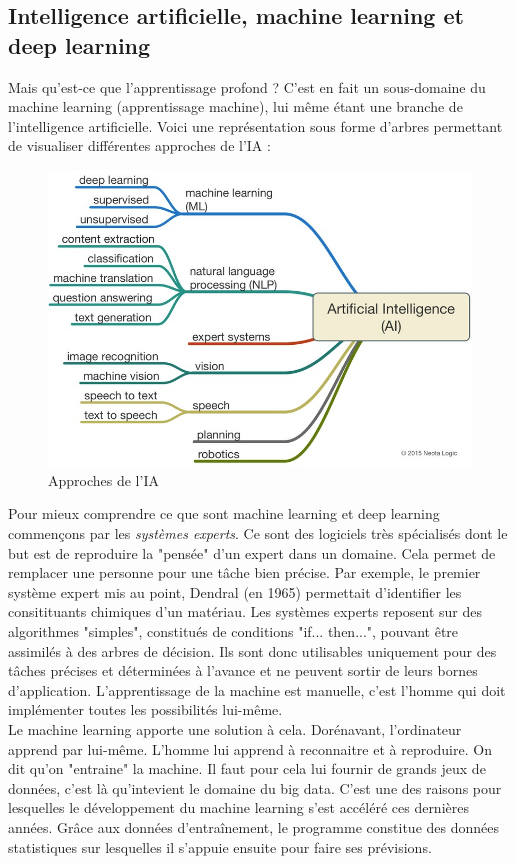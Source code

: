 \subsection{Intelligence artificielle, machine learning et deep learning}
	Mais qu'est-ce que l'apprentissage profond ? C'est en fait un sous-domaine du machine learning (apprentissage machine), lui même étant une branche de l'intelligence artificielle. Voici une représentation sous forme d'arbres permettant de visualiser différentes approches de l'IA : 
	\begin{figure}[H]
		\centering\includegraphics[width=0.7\linewidth]{images/branches}
		\caption{Approches de l'IA}
	\end{figure}
	Pour mieux comprendre ce que sont machine learning et deep learning commençons par les \textit{systèmes experts}. Ce sont des logiciels très spécialisés dont le but est de reproduire la "pensée" d'un expert dans un domaine. Cela permet de remplacer une personne pour une tâche bien précise. Par exemple, le premier système expert mis au point, Dendral (en 1965) permettait d'identifier les consitituants chimiques d'un matériau. Les systèmes experts reposent sur des algorithmes "simples", constitués de conditions "if... then...", pouvant être assimilés à des arbres de décision. Ils sont donc utilisables uniquement pour des tâches précises et déterminées à l'avance et ne peuvent sortir de leurs bornes d'application. L'apprentissage de la machine est manuelle, c'est l'homme qui doit implémenter toutes les possibilités lui-même.\\
	
	Le machine learning apporte une solution à cela. Dorénavant, l'ordinateur apprend par lui-même. L'homme lui apprend à reconnaitre et à reproduire. On dit qu'on "entraine" la machine. Il faut pour cela lui fournir de grands jeux de données, c'est là qu'intevient le domaine du big data. C'est une des raisons pour lesquelles le développement du machine learning s'est accéléré ces dernières années. Grâce aux données d'entraînement, le programme constitue des données statistiques sur lesquelles il s'appuie ensuite pour faire ses prévisions. \\
	
